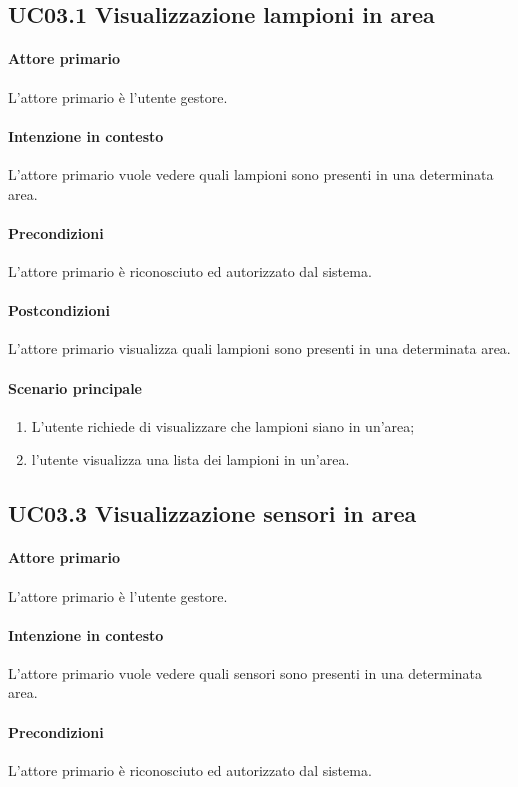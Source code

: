 \subsection{UC03.1 Visualizzazione lampioni in area}
\paragraph{Attore primario} L'attore primario è l'utente gestore.
\paragraph{Intenzione in contesto} L'attore primario vuole vedere quali lampioni sono presenti in una determinata area.
\paragraph{Precondizioni}L'attore primario è riconosciuto ed autorizzato dal sistema.
\paragraph{Postcondizioni} L'attore primario visualizza quali lampioni sono presenti in una determinata area.

\paragraph{Scenario principale}
\begin{enumerate}
    \item L'utente richiede di visualizzare che lampioni siano in un'area;
    \item l'utente visualizza una lista dei lampioni in un'area.
\end{enumerate}

\subsection{UC03.3 Visualizzazione sensori in area}
\paragraph{Attore primario} L'attore primario è l'utente gestore.
\paragraph{Intenzione in contesto} L'attore primario vuole vedere quali sensori sono presenti in una determinata area.
\paragraph{Precondizioni}L'attore primario è riconosciuto ed autorizzato dal sistema.
